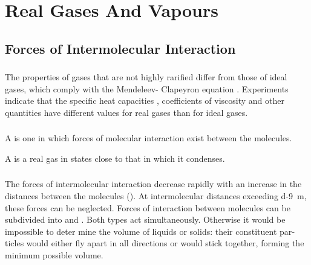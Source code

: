 
\chapter{Real Gases And Vapours}
\label{ch-12}


\section{Forces of Intermolecular Interaction}
\label{sec-12.1}

\subsection{}\label{12.1.1} The properties of gases that are not highly rarified differ from those of ideal gases, which comply with the Mendeleev- Clapeyron equation . Experiments indicate that the specific heat capacities , coefficients of viscosity  and other quantities have different values for real gases than for ideal gases.

\subsection{}\label{12.1.2} A  is one in which forces of molecular interaction exist between the molecules.

A  is a real gas in states close to that in which it con­denses.

\subsection{}\label{12.1.3} The forces of intermolecular interaction decrease rapidly with an increase in the distances between the molecules (). At intermolecu­lar distances exceeding \SI{d-9}{\meter},
these forces can be neglected. Forces of interaction between molecules can be subdivided into  and . Both types act simultaneously. Otherwise it would be impossible to deter­ mine the volume of liquids or solids: their constituent par­ticles would either fly apart in all directions or would stick together, forming the minimum possible volume.

